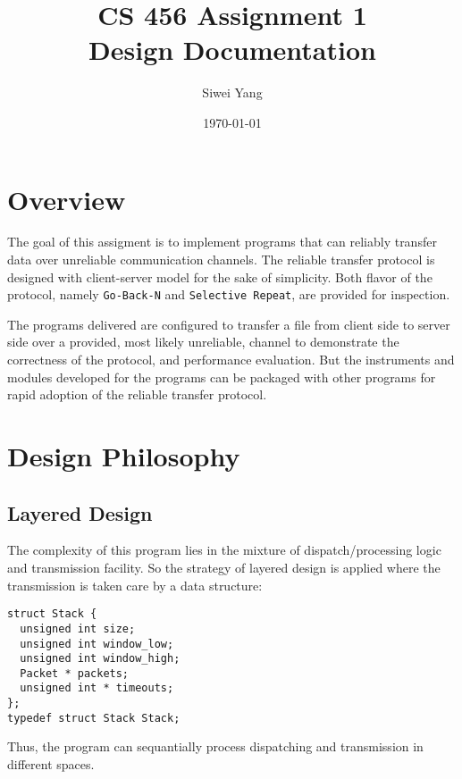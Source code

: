 \documentclass[12pt]{article}
\begin{document}
\title{CS 456 Assignment 1\\Design Documentation}
\date{\today}
\author{Siwei Yang}
\maketitle

\section{Overview}
The goal of this assigment is to implement programs that can reliably transfer data over unreliable communication channels. The reliable transfer protocol is designed with client-server model for the sake of simplicity. Both flavor of the protocol, namely \texttt{Go-Back-N} and \texttt{Selective Repeat}, are provided for inspection.

The programs delivered are configured to transfer a file from client side to server side over a provided, most likely unreliable, channel to demonstrate the correctness of the protocol, and performance evaluation. But the instruments and modules developed for the programs can be packaged with other programs for rapid adoption of the reliable transfer protocol.

\section{Design Philosophy}
\subsection{Layered Design}
The complexity of this program lies in the mixture of dispatch/processing logic and transmission facility. So the strategy of layered design is applied where the transmission is taken care by a data structure:
\begin{samepage}
\begin{verbatim}
struct Stack {
  unsigned int size;
  unsigned int window_low;
  unsigned int window_high;
  Packet * packets;
  unsigned int * timeouts;
};
typedef struct Stack Stack;
\end{verbatim}
\end{samepage}
Thus, the program can sequantially process dispatching and transmission in different spaces.
\end{document}
